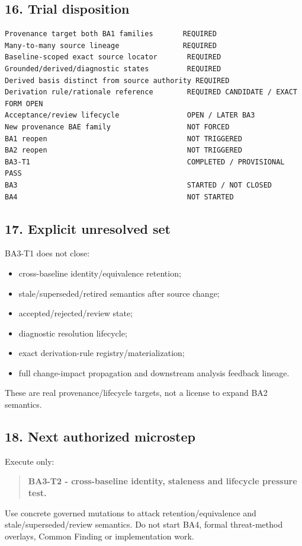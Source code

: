 \documentclass[11pt,a4paper]{article}
\providecommand{\tightlist}{\setlength{\itemsep}{0pt}\setlength{\parskip}{0pt}}
\begin{document}
\subsection{16. Trial disposition}\label{16-trial-disposition}

\begin{verbatim}
Provenance target both BA1 families       REQUIRED
Many-to-many source lineage               REQUIRED
Baseline-scoped exact source locator       REQUIRED
Grounded/derived/diagnostic states         REQUIRED
Derived basis distinct from source authority REQUIRED
Derivation rule/rationale reference        REQUIRED CANDIDATE / EXACT FORM OPEN
Acceptance/review lifecycle                OPEN / LATER BA3
New provenance BAE family                  NOT FORCED
BA1 reopen                                 NOT TRIGGERED
BA2 reopen                                 NOT TRIGGERED
BA3-T1                                     COMPLETED / PROVISIONAL PASS
BA3                                        STARTED / NOT CLOSED
BA4                                        NOT STARTED
\end{verbatim}

\subsection{17. Explicit unresolved set}\label{17-explicit-unresolved-set}

BA3-T1 does not close:

\begin{itemize}
\tightlist
\item
  cross-baseline identity/equivalence retention;
\item
  stale/superseded/retired semantics after source change;
\item
  accepted/rejected/review state;
\item
  diagnostic resolution lifecycle;
\item
  exact derivation-rule registry/materialization;
\item
  full change-impact propagation and downstream analysis feedback lineage.
\end{itemize}

These are real provenance/lifecycle targets, not a license to expand BA2 semantics.

\subsection{18. Next authorized microstep}\label{18-next-authorized-microstep}

Execute only:

\begin{quote}
\textbf{BA3-T2 - cross-baseline identity, staleness and lifecycle pressure test.}
\end{quote}

Use concrete governed mutations to attack retention/equivalence and stale/superseded/review semantics. Do not start BA4, formal threat-method overlays, Common Finding or implementation work.
\end{document}
